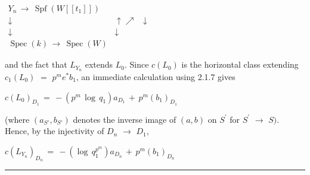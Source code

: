 \documentclass[9pt]{article}
\newcommand{\CanonText}[1]{\par{\fontsize{8.0}{9.35}\selectfont\RaggedRight #1\par}\vspace{2.2pt}}
\newcommand{\CanonDisplay}[1]{\par\vspace{1.2pt}\begin{center}{\fontsize{7.2}{8.4}\selectfont\(\displaystyle #1\)}\end{center}\vspace{1.2pt}}
\newenvironment{CanonMathBlock}{\par\vspace{1.2pt}\begin{center}\fontsize{6.8}{8.0}\selectfont\(\displaystyle}{\)\end{center}\vspace{1.2pt}}
\begin{document}
\begin{minipage}[t][\dimexpr\textheight-5pt\relax][t]{\textwidth}
\begin{CanonMathBlock}
\begin{array}{ccc}
Y_{n}\,\longrightarrow{}\,\operatorname{Spf}(W[[t_{1}]]) & {} & {}\\
\downarrow{} & \uparrow{}\nearrow{} & \downarrow{}\\
\downarrow{} & \downarrow{} & {}\\
\operatorname{Spec}(k)\,\longrightarrow{}\,\operatorname{Spec}(W) & {} & {}
\end{array}
\end{CanonMathBlock}
\CanonText{and the fact that \(L_{Y_{n}}\) extends \(L_{0}\). Since \(c(L_{0})\) is the horizontal class extending \(c_{1}(L_{0})\) \(=\) \(p^{m}e^{*}b_{1}\), an immediate calculation using 2.1.7 gives}
\CanonDisplay{c(L_{0})_{D_{1}}\,=\,-(p^{m}\,\operatorname{log}\,q_{1})a_{D_{1}}\,+\,p^{m}(b_{1})_{D_{1}}}
\CanonText{(where \((a_{S'},b_{S'})\) denotes the inverse image of \((a,b)\) on \(S^{\prime}\) for \(S^{\prime}\) \(\to{}\) \(S)\). Hence, by the injectivity of \(D_{n}\) \(\to{}\) \(D_{1}\),}
\CanonDisplay{c(L_{Y_{n}})_{D_{n}}\,=\,-(\operatorname{log}\,q_{1}^{p^{m}})a_{D_{n}}\,+\,p^{m}(b_{1})_{D_{n}}}
\vfill
{\color{Accent}\hrule height 0.35pt}\vspace{3pt}
\end{minipage}
\newpage
\end{document}
